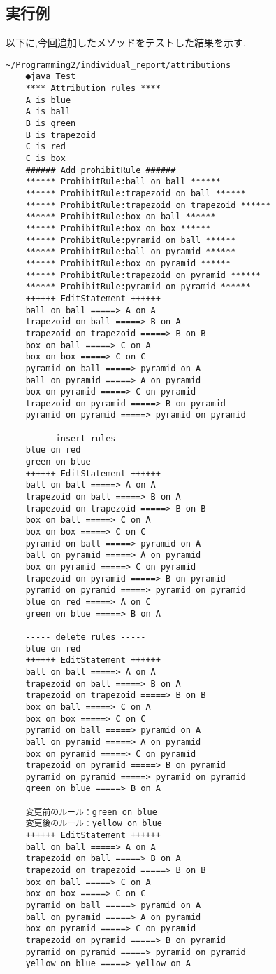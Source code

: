 \documentclass[uplatex,12pt]{jsarticle}
\begin{document}
\subsection{実行例}
以下に,今回追加したメソッドをテストした結果を示す.
\begin{lstlisting}[caption=editProhibitRulesメソッドの実装, label=mid]
    ~/Programming2/individual_report/attributions
    ●java Test   
    **** Attribution rules ****
    A is blue
    A is ball
    B is green
    B is trapezoid
    C is red
    C is box
    ###### Add prohibitRule ######
    ****** ProhibitRule:ball on ball ******
    ****** ProhibitRule:trapezoid on ball ******
    ****** ProhibitRule:trapezoid on trapezoid ******
    ****** ProhibitRule:box on ball ******
    ****** ProhibitRule:box on box ******
    ****** ProhibitRule:pyramid on ball ******
    ****** ProhibitRule:ball on pyramid ******
    ****** ProhibitRule:box on pyramid ******
    ****** ProhibitRule:trapezoid on pyramid ******
    ****** ProhibitRule:pyramid on pyramid ******
    ++++++ EditStatement ++++++
    ball on ball =====> A on A
    trapezoid on ball =====> B on A
    trapezoid on trapezoid =====> B on B
    box on ball =====> C on A
    box on box =====> C on C
    pyramid on ball =====> pyramid on A
    ball on pyramid =====> A on pyramid
    box on pyramid =====> C on pyramid
    trapezoid on pyramid =====> B on pyramid
    pyramid on pyramid =====> pyramid on pyramid
    
    ----- insert rules -----
    blue on red
    green on blue
    ++++++ EditStatement ++++++
    ball on ball =====> A on A
    trapezoid on ball =====> B on A
    trapezoid on trapezoid =====> B on B
    box on ball =====> C on A
    box on box =====> C on C
    pyramid on ball =====> pyramid on A
    ball on pyramid =====> A on pyramid
    box on pyramid =====> C on pyramid
    trapezoid on pyramid =====> B on pyramid
    pyramid on pyramid =====> pyramid on pyramid
    blue on red =====> A on C
    green on blue =====> B on A
    
    ----- delete rules -----
    blue on red
    ++++++ EditStatement ++++++
    ball on ball =====> A on A
    trapezoid on ball =====> B on A
    trapezoid on trapezoid =====> B on B
    box on ball =====> C on A
    box on box =====> C on C
    pyramid on ball =====> pyramid on A
    ball on pyramid =====> A on pyramid
    box on pyramid =====> C on pyramid
    trapezoid on pyramid =====> B on pyramid
    pyramid on pyramid =====> pyramid on pyramid
    green on blue =====> B on A
    
    変更前のルール：green on blue
    変更後のルール：yellow on blue
    ++++++ EditStatement ++++++
    ball on ball =====> A on A
    trapezoid on ball =====> B on A
    trapezoid on trapezoid =====> B on B
    box on ball =====> C on A
    box on box =====> C on C
    pyramid on ball =====> pyramid on A
    ball on pyramid =====> A on pyramid
    box on pyramid =====> C on pyramid
    trapezoid on pyramid =====> B on pyramid
    pyramid on pyramid =====> pyramid on pyramid
    yellow on blue =====> yellow on A
\end{lstlisting}
\end{document}
